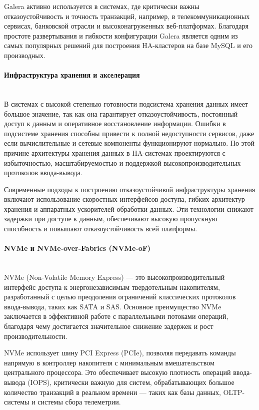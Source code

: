 Galera активно используется в системах, где критически важны отказоустойчивость и точность транзакций, например, в телекоммуникационных сервисах, банковской отрасли и высоконагруженных веб-платформах. Благодаря простоте развертывания и гибкости конфигурации Galera является одним из самых популярных решений для построения HA-кластеров на базе MySQL и его производных.

\paragraph{Инфраструктура хранения и акселерация} ~\\
В системах с высокой степенью готовности подсистема хранения данных имеет большое значение, так как она гарантирует отказоустойчивость, постоянный доступ к данным и оперативное восстановление информации. Ошибки в подсистеме хранения способны привести к полной недоступности сервисов, даже если вычислительные и сетевые компоненты функционируют нормально. По этой причине архитектуры хранения данных в HA-системах проектируются с избыточностью, масштабируемостью и поддержкой высокопроизводительных протоколов ввода-вывода. \autocite{SnedakerS}

Современные подходы к построению отказоустойчивой инфраструктуры хранения включают использование скоростных интерфейсов доступа, гибких архитектур хранения и аппаратных ускорителей обработки данных. Эти технологии снижают задержки при доступе к данным, обеспечивают высокую пропускную способность и повышают отказоустойчивость всей платформы.

\paragraph{NVMe и NVMe-over-Fabrics (NVMe-oF)} ~\\
NVMe (Non-Volatile Memory Express) — это высокопроизводительный интерфейс доступа к энергонезависимым твердотельным накопителям, разработанный с целью преодоления ограничений классических протоколов ввода-вывода, таких как SATA и SAS. Основное преимущество NVMe заключается в эффективной работе с параллельными потоками операций, благодаря чему достигается значительное снижение задержек и рост производительности. \autocite{Nvme}

NVMe использует шину PCI Express (PCIe), позволяя передавать команды напрямую в контроллер накопителя с минимальным вмешательством центрального процессора. Это обеспечивает высокую плотность операций ввода-вывода (IOPS), критически важную для систем, обрабатывающих большое количество транзакций в реальном времени — таких как базы данных, OLTP-системы и системы сбора телеметрии.

